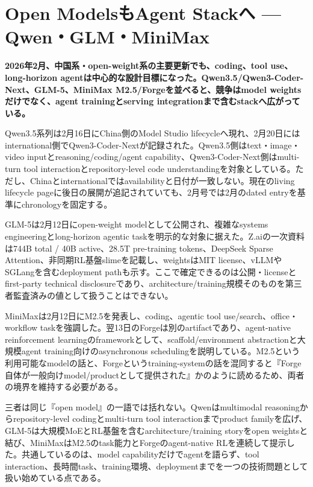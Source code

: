 \section{Open ModelsもAgent Stackへ — Qwen・GLM・MiniMax}
\label{pkg:open-model-agent-stack}
\noindent\textbf{2026年2月、中国系・open-weight系の主要更新でも、coding、tool use、long-horizon agentは中心的な設計目標になった。Qwen3.5/Qwen3-Coder-Next、GLM-5、MiniMax M2.5/Forgeを並べると、競争はmodel weightsだけでなく、agent trainingとserving integrationまで含むstackへ広がっている。}\autocite{src-9156c37fb1c2,src-d8e13386974c,src-eac8dfbeb78c}

Qwen3.5系列は2月16日にChina側のModel Studio lifecycleへ現れ、2月20日にはinternational側でQwen3-Coder-Nextが記録された。Qwen3.5側はtext・image・video inputとreasoning/coding/agent capability、Qwen3-Coder-Next側はmulti-turn tool interactionとrepository-level code understandingを対象としている。ただし、Chinaとinternationalではavailabilityと日付が一致しない。現在のliving lifecycle pageに後日の展開が追記されていても、2月号では2月のdated entryを基準にchronologyを固定する。\autocite{src-eac8dfbeb78c}


GLM-5は2月12日にopen-weight modelとして公開され、複雑なsystems engineeringとlong-horizon agentic taskを明示的な対象に据えた。Z.aiの一次資料は744B total / 40B active、28.5T pre-training tokens、DeepSeek Sparse Attention、非同期RL基盤slimeを記載し、weightsはMIT license、vLLMやSGLangを含むdeployment pathも示す。ここで確定できるのは公開・licenseとfirst-party technical disclosureであり、architecture/training規模そのものを第三者監査済みの値として扱うことはできない。\autocite{src-9156c37fb1c2}


MiniMaxは2月12日にM2.5を発表し、coding、agentic tool use/search、office・workflow taskを強調した。翌13日のForgeは別のartifactであり、agent-native reinforcement learningのframeworkとして、scaffold/environment abstractionと大規模agent training向けのasynchronous schedulingを説明している。M2.5という利用可能なmodelの話と、Forgeというtraining-systemの話を混同すると『Forge自体が一般向けmodel/productとして提供された』かのように読めるため、両者の境界を維持する必要がある。\autocite{src-d8e13386974c}


三者は同じ『open model』の一語では括れない。Qwenはmultimodal reasoningからrepository-level codingとmulti-turn tool interactionまでproduct familyを広げ、GLM-5は大規模MoEとRL基盤を含むarchitecture/training storyをopen weightsと結び、MiniMaxはM2.5のtask能力とForgeのagent-native RLを連続して提示した。共通しているのは、model capabilityだけでagentを語らず、tool interaction、長時間task、training環境、deploymentまでを一つの技術問題として扱い始めている点である。\autocite{src-9156c37fb1c2,src-d8e13386974c,src-eac8dfbeb78c}


